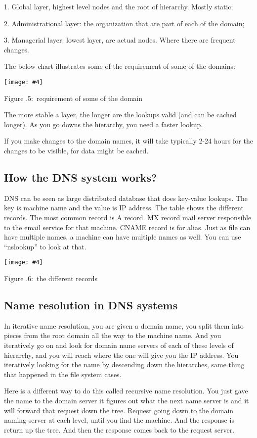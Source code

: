 \documentclass[twoside]{article}
\newcounter{lecnum}
\newcommand{\fig}[4]{
            \centerline{\texttt{[image: \#4]}}
            \begin{center}
            Figure \thelecnum.#1:~#3
            \end{center}
    }
\begin{document}
1.	Global layer, highest level nodes and the root of hierarchy. Mostly static;

2.	Administrational layer: the organization that are part of each of the domain;

3.	Managerial layer: lowest layer, are actual nodes. Where there are frequent changes.

The below chart illustrates some of the requirement of some of the domains:

\fig{5}{0.4}{requirement of some of the domain}{requirement.png}

The more stable a layer, the longer are the lookups valid (and can be cached longer). As you go downs the hierarchy, you need a faster lookup.

If you make changes to the domain names, it will take typically 2-24 hours for the changes to be visible, for data might be cached.

\subsection{How the DNS system works?}
DNS can be seen as large distributed database that does key-value lookups. The key is machine name and the value is IP address. The table shows the different records. The most common record is A record. MX record mail server responsible to the email service for that machine. CNAME record is for alias. Just as file can have multiple names, a machine can have multiple names as well. You can use “nslookup” to look at that.

\fig{6}{0.4}{the different records}{records.png}

\subsection{Name resolution in DNS systems}
In iterative name resolution, you are given a domain name, you split them into pieces from the root domain all the way to the machine name. And you iteratively go on and look for domain name servers of each of these levels of hierarchy, and you will reach where the one will give you the IP address. You iteratively looking for the name by descending down the hierarches, same thing that happened in the file system cases. 

Here is a different way to do this called recursive name resolution. You just gave the name to the domain server it figures out what the next name server is and it will forward that request down the tree. Request going down to the domain naming server at each level, until you find the machine. And the response is return up the tree. And then the response comes back to the request server. 
\end{document}
